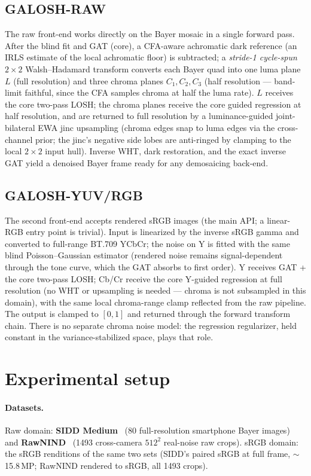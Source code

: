 \documentclass[10pt,twocolumn]{article}
\begin{document}
\subsection{GALOSH-RAW}\label{sec:raw}
The raw front-end works directly on the Bayer mosaic in a single forward pass.
After the blind fit and GAT (core), a CFA-aware achromatic dark reference
(an IRLS estimate of the local achromatic floor) is subtracted; a
\emph{stride-1 cycle-spun} $2{\times}2$ Walsh--Hadamard transform converts each
Bayer quad into one luma plane $L$ (full resolution) and three chroma planes
$C_1,C_2,C_3$ (half resolution --- band-limit faithful, since the CFA samples
chroma at half the luma rate). $L$ receives the core two-pass LOSH; the chroma
planes receive the core guided regression at half resolution, and are returned
to full resolution by a luminance-guided joint-bilateral EWA jinc upsampling
(chroma edges snap to luma edges via the cross-channel prior; the jinc's
negative side lobes are anti-ringed by clamping to the local $2{\times}2$
input hull). Inverse WHT, dark restoration, and the exact inverse GAT yield a
denoised Bayer frame ready for any demosaicing back-end.

\subsection{GALOSH-YUV/RGB}\label{sec:yuv}
The second front-end accepts rendered sRGB images (the main API; a linear-RGB
entry point is trivial). Input is linearized by the inverse sRGB gamma and
converted to full-range BT.709 YCbCr; the noise on Y is fitted with the same
blind Poisson--Gaussian estimator (rendered noise remains signal-dependent
through the tone curve, which the GAT absorbs to first order). Y receives GAT
+ the core two-pass LOSH; Cb/Cr receive the core Y-guided regression at full
resolution (no WHT or upsampling is needed --- chroma is not subsampled in this
domain), with the same local chroma-range clamp reflected from the raw
pipeline. The output is clamped to $[0,1]$ and returned through the forward
transform chain. There is no separate chroma noise model: the regression
regularizer, held constant in the variance-stabilized space, plays that role.

\section{Experimental setup}\label{sec:exp}
\paragraph{Datasets.} Raw domain: \textbf{SIDD Medium}~\cite{sidd} (80
full-resolution smartphone Bayer images) and \textbf{RawNIND}~\cite{rawnind}
(1493 cross-camera $512^2$ real-noise raw crops). sRGB domain: the sRGB
renditions of the same two sets (SIDD's paired sRGB at full frame, $\sim$15.8\,MP; RawNIND
rendered to sRGB, all 1493 crops).
\end{document}
